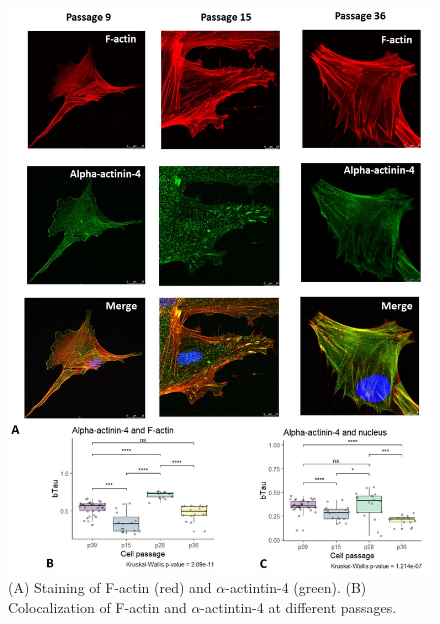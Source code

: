 \documentclass[alpha-refs]{wiley-article}
\begin{document}
\begin{figure}[hbt!]
\centering
\includegraphics[width=0.9\linewidth]{alpha-actinin-4.jpg}
\caption{(A) Staining of F-actin (red) and $\alpha$-actintin-4 (green).
(B) Colocalization of F-actin and $\alpha$-actintin-4 at different passages.}
\end{figure}
\end{document}

